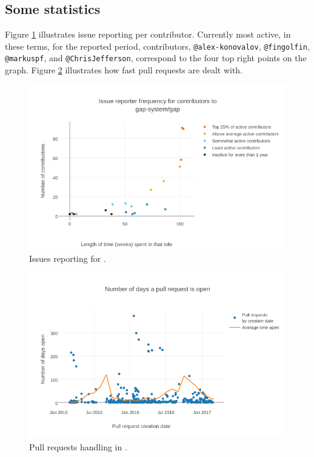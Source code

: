 \documentclass{deliverablereport}
\begin{document}
\subsection*{Some \GAP statistics}
Figure \ref{wp7:fig:GAPissues} illustrates issue reporting
per contributor.
Currently most active, in these terms,
for the reported period, contributors, {\tt @alex-konovalov},
{\tt @fingolfin}, {\tt @markuspf}, and {\tt @ChrisJefferson}, 
correspond to the four top right points on the graph. 
Figure \ref{wp7:fig:GAPpulls} illustrates how fast pull
requests are dealt with.

\begin{figure}[ht]
  \includegraphics[width=\textwidth]{gap-issuereporting}
    \caption{Issues reporting for \GAP.
    \label{wp7:fig:GAPissues}}
\end{figure}

\begin{figure}[ht]
  \includegraphics[width=\textwidth]{gap-pullrequests}
    \caption{Pull requests handling in \GAP.\label{wp7:fig:GAPpulls}}
\end{figure}
\end{document}
